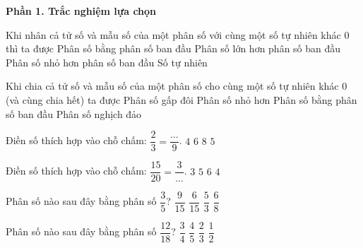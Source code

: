 \textbf{Phần 1. Trắc nghiệm lựa chọn}

\begin{ex} %
Khi nhân cả tử số và mẫu số của một phân số với cùng một số tự nhiên khác 0 thì ta được
\choice
{\True Phân số bằng phân số ban đầu}
{Phân số lớn hơn phân số ban đầu}
{Phân số nhỏ hơn phân số ban đầu}
{Số tự nhiên}
\end{ex}

\begin{ex} %
Khi chia cả tử số và mẫu số của một phân số cho cùng một số tự nhiên khác 0 (và cùng chia hết) ta được
\choice
{Phân số gấp đôi}
{Phân số nhỏ hơn}
{\True Phân số bằng phân số ban đầu}
{Phân số nghịch đảo}
\end{ex}

\begin{ex} %
Điền số thích hợp vào chỗ chấm: $\dfrac{2}{3} = \dfrac{\dots}{9}$.
\choice
{$4$}
{\True $6$}
{$8$}
{$5$}
\end{ex}

\begin{ex} %
Điền số thích hợp vào chỗ chấm: $\dfrac{15}{20} = \dfrac{3}{\dots}$.
\choice
{$3$}
{$5$}
{$6$}
{\True $4$}
\end{ex}

\begin{ex} %
Phân số nào sau đây bằng phân số $\dfrac{3}{5}$?
\choice
{\True $\dfrac{9}{15}$}
{$\dfrac{6}{15}$}
{$\dfrac{5}{3}$}
{$\dfrac{6}{8}$}
\end{ex}

\begin{ex} %
Phân số nào sau đây bằng phân số $\dfrac{12}{18}$?
\choice
{$\dfrac{3}{4}$}
{$\dfrac{4}{5}$}
{\True $\dfrac{2}{3}$}
{$\dfrac{1}{2}$}
\end{ex}

